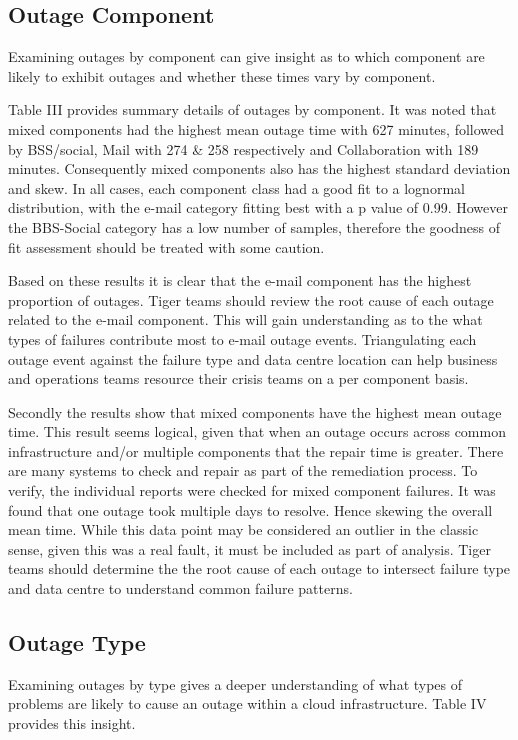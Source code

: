 \subsection{Outage Component}

Examining outages by component can give insight as to which component are likely to exhibit outages and whether these times vary by component. \par

Table III provides summary details of outages by component. It was noted that mixed components had the highest mean outage time with 627 minutes, followed by BSS/social, Mail with 274 \& 258 respectively and Collaboration with 189 minutes. Consequently mixed components also has the highest standard deviation and skew. In all cases, each component class had a good fit to a lognormal distribution, with the e-mail category fitting best with a p value of 0.99. However the BBS-Social category has a low number of samples, therefore the goodness of fit assessment should be treated with some caution. \par

Based on these results it is clear that the e-mail component has the highest proportion of outages. Tiger teams should review the root cause of each outage related to the e-mail component.  This will gain understanding as to the what types of failures contribute most to e-mail outage events. Triangulating each outage event against the failure type and data centre location can help business and operations teams resource their crisis teams on a per component basis.

Secondly the results show that mixed components have the highest mean outage time. This result seems logical, given that when an outage occurs across common infrastructure and/or multiple components that the repair time is greater. There are many systems to check and repair as part of the remediation process. To verify, the individual reports were checked for mixed component failures. It was found that one outage took multiple days to resolve. Hence skewing the overall mean time. While this data point may be considered an outlier in the classic sense, given this was a real fault, it must be included as part of analysis. Tiger teams should determine the the root cause of each outage to intersect failure type and data centre to understand common failure patterns. \par


\subsection{Outage Type}
Examining outages by type gives a deeper understanding of what types of problems are likely to cause an outage within a cloud infrastructure. Table IV provides this insight. \par


